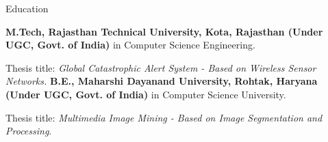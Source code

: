 \begin{rubric}{Education}

\entry*[2009 -- 2011]%
	\textbf{M.Tech, Rajasthan Technical University, Kota, Rajasthan (Under UGC, Govt. of India)} in Computer Science Engineering.
	\par Thesis title: \emph{Global Catastrophic Alert System - Based on Wireless Sensor Networks.}
%
\entry*[2005 -- 2009]%
	\textbf{B.E., Maharshi Dayanand University, Rohtak, Haryana (Under UGC, Govt. of India)} in Computer Science University.\par
	Thesis title: \emph{Multimedia Image Mining - Based on Image Segmentation and Processing}.
\end{rubric}